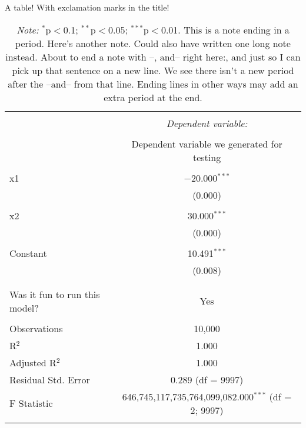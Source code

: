 \begin{table}[!h] \centering 
  \caption{A table! With exclamation marks in the title!} 
  \label{model_output_label_for_crossref}
  \footnotesize
\begin{tabular}{@{\extracolsep{5pt}}lc} 
\\[-1.8ex]\hline 
\hline \\[-1.8ex] 
 & \multicolumn{1}{c}{\textit{Dependent variable:}} \\ 
\cline{2-2} 
\\[-1.8ex] & Dependent variable we generated for testing \\ 
\hline \\[-1.8ex] 
 x1 & $-$20.000$^{***}$ \\ 
  & (0.000) \\ 
  & \\ 
 x2 & 30.000$^{***}$ \\ 
  & (0.000) \\ 
  & \\ 
 Constant & 10.491$^{***}$ \\ 
  & (0.008) \\ 
  & \\ 
\hline \\[-1.8ex] 
Was it fun to run this model? & Yes \\ 
\hline \\[-1.8ex] 
Observations & 10,000 \\ 
R$^{2}$ & 1.000 \\ 
Adjusted R$^{2}$ & 1.000 \\ 
Residual Std. Error & 0.289 (df = 9997) \\ 
F Statistic & 646,745,117,735,764,099,082.000$^{***}$ (df = 2; 9997) \\ 
\hline 
\hline \\[-1.8ex] 
\end{tabular} \\
\footnotesize
\caption*{\footnotesize \centering \textit{Note:} $^{*}$p$<$0.1; $^{**}$p$<$0.05; $^{***}$p$<$0.01. This is a note ending in a period. Here's another note. Could also have written one long note instead. About to end a note with --, and-- right here:, and just so I can pick up that sentence on a new line. We see there isn't a new period after the --and-- from that line. Ending lines in other ways may add an extra period at the end.}
\end{table} 
